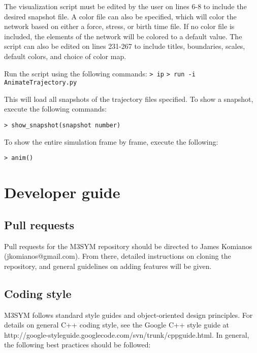 \documentclass[11pt, oneside]{article}   	%
\begin{document}
The visualization script must be edited by the user on lines 6-8 to include the desired snapshot file. A color file can also be specified, which will color the network based on either a force, stress, or birth time file. If no color file is included, the elements of the network will be colored to a default value. The script can also be edited on lines 231-267 to include titles, boundaries, scales, default colors, and choice of color map. \newline

\noindent Run the script using the following commands:\newline\newline
\indent\texttt{> ip}\newline
\indent\texttt{> run -i AnimateTrajectory.py}\newline

\noindent This will load all snapshots of the trajectory files specified. To show a snapshot, execute the following commands:\newline

\texttt{> show\_snapshot(snapshot number)}\newline

\noindent To show the entire simulation frame by frame, execute the following:\newline

\texttt{> anim()}

\section{Developer guide}

\subsection{Pull requests}

Pull requests for the M3SYM repository should be directed to James Komianos (jkomianos@gmail.com). From there, detailed instructions on cloning the repository, and general guidelines on adding features will be given.

\subsection{Coding style}

M3SYM follows standard style guides and object-oriented design principles. For details on general C++ coding style, see the Google C++ style guide at http://google-styleguide.googlecode.com/svn/trunk/cppguide.html. In general, the following best practices should be followed:
\end{document}
